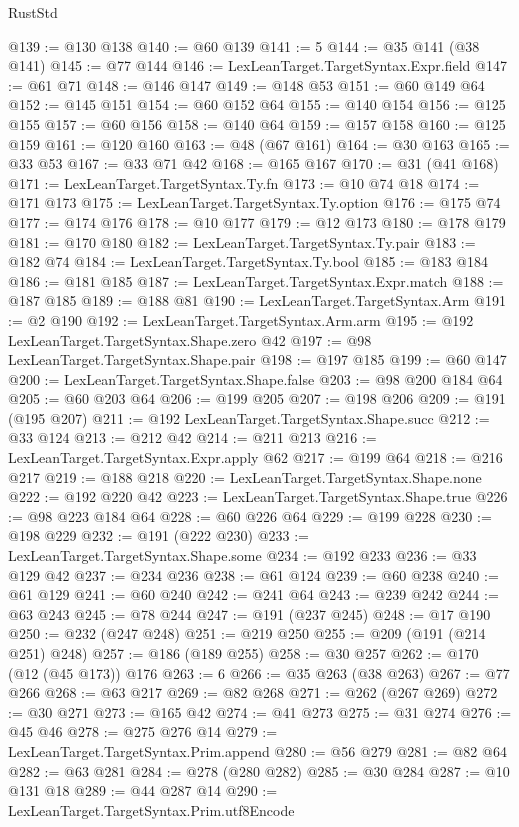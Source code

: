 \begin{lexlean}{RustStd}
\begin{coremodule}
@139 := @130 @138
@140 := @60 @139
@141 := 5
@144 := @35 @141 (@38 @141)
@145 := @77 @144
@146 := LexLeanTarget.TargetSyntax.Expr.field
@147 := @61 @71
@148 := @146 @147
@149 := @148 @53
@151 := @60 @149 @64
@152 := @145 @151
@154 := @60 @152 @64
@155 := @140 @154
@156 := @125 @155
@157 := @60 @156
@158 := @140 @64
@159 := @157 @158
@160 := @125 @159
@161 := @120 @160
@163 := @48 (@67 @161)
@164 := @30 @163
@165 := @33 @53
@167 := @33 @71 @42
@168 := @165 @167
@170 := @31 (@41 @168)
@171 := LexLeanTarget.TargetSyntax.Ty.fn
@173 := @10 @74 @18
@174 := @171 @173
@175 := LexLeanTarget.TargetSyntax.Ty.option
@176 := @175 @74
@177 := @174 @176
@178 := @10 @177
@179 := @12 @173
@180 := @178 @179
@181 := @170 @180
@182 := LexLeanTarget.TargetSyntax.Ty.pair
@183 := @182 @74
@184 := LexLeanTarget.TargetSyntax.Ty.bool
@185 := @183 @184
@186 := @181 @185
@187 := LexLeanTarget.TargetSyntax.Expr.match
@188 := @187 @185
@189 := @188 @81
@190 := LexLeanTarget.TargetSyntax.Arm
@191 := @2 @190
@192 := LexLeanTarget.TargetSyntax.Arm.arm
@195 := @192 LexLeanTarget.TargetSyntax.Shape.zero @42
@197 := @98 LexLeanTarget.TargetSyntax.Shape.pair
@198 := @197 @185
@199 := @60 @147
@200 := LexLeanTarget.TargetSyntax.Shape.false
@203 := @98 @200 @184 @64
@205 := @60 @203 @64
@206 := @199 @205
@207 := @198 @206
@209 := @191 (@195 @207)
@211 := @192 LexLeanTarget.TargetSyntax.Shape.succ
@212 := @33 @124
@213 := @212 @42
@214 := @211 @213
@216 := LexLeanTarget.TargetSyntax.Expr.apply @62
@217 := @199 @64
@218 := @216 @217
@219 := @188 @218
@220 := LexLeanTarget.TargetSyntax.Shape.none
@222 := @192 @220 @42
@223 := LexLeanTarget.TargetSyntax.Shape.true
@226 := @98 @223 @184 @64
@228 := @60 @226 @64
@229 := @199 @228
@230 := @198 @229
@232 := @191 (@222 @230)
@233 := LexLeanTarget.TargetSyntax.Shape.some
@234 := @192 @233
@236 := @33 @129 @42
@237 := @234 @236
@238 := @61 @124
@239 := @60 @238
@240 := @61 @129
@241 := @60 @240
@242 := @241 @64
@243 := @239 @242
@244 := @63 @243
@245 := @78 @244
@247 := @191 (@237 @245)
@248 := @17 @190
@250 := @232 (@247 @248)
@251 := @219 @250
@255 := @209 (@191 (@214 @251) @248)
@257 := @186 (@189 @255)
@258 := @30 @257
@262 := @170 (@12 (@45 @173)) @176
@263 := 6
@266 := @35 @263 (@38 @263)
@267 := @77 @266
@268 := @63 @217
@269 := @82 @268
@271 := @262 (@267 @269)
@272 := @30 @271
@273 := @165 @42
@274 := @41 @273
@275 := @31 @274
@276 := @45 @46
@278 := @275 @276 @14
@279 := LexLeanTarget.TargetSyntax.Prim.append
@280 := @56 @279
@281 := @82 @64
@282 := @63 @281
@284 := @278 (@280 @282)
@285 := @30 @284
@287 := @10 @131 @18
@289 := @44 @287 @14
@290 := LexLeanTarget.TargetSyntax.Prim.utf8Encode

\end{coremodule}
\end{lexlean}

